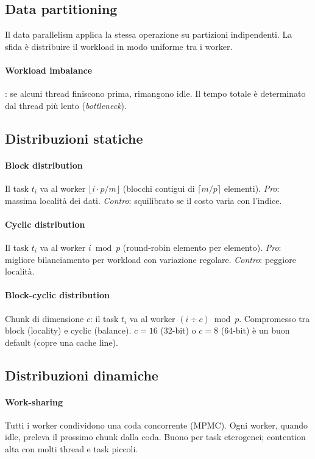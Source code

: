 \documentclass[11pt,a4paper]{article}
\theoremstyle{remark}
\begin{document}
\subsection{Data partitioning}

Il data parallelism applica la stessa operazione su partizioni indipendenti. La sfida è distribuire il workload in modo uniforme tra i worker.

\paragraph{Workload imbalance}: se alcuni thread finiscono prima, rimangono idle. Il tempo totale è determinato dal thread più lento (\emph{bottleneck}).

\subsection{Distribuzioni statiche}

\paragraph{Block distribution}
Il task $t_i$ va al worker $\lfloor i \cdot p / m \rfloor$ (blocchi contigui di $\lceil m/p \rceil$ elementi).
\emph{Pro}: massima località dei dati. \emph{Contro}: squilibrato se il costo varia con l'indice.

\paragraph{Cyclic distribution}
Il task $t_i$ va al worker $i \bmod p$ (round-robin elemento per elemento).
\emph{Pro}: migliore bilanciamento per workload con variazione regolare. \emph{Contro}: peggiore località.

\paragraph{Block-cyclic distribution}
Chunk di dimensione $c$: il task $t_i$ va al worker $(i \div c) \bmod p$.
Compromesso tra block (locality) e cyclic (balance). $c = 16$ (32-bit) o $c = 8$ (64-bit) è un buon default (copre una cache line).

\subsection{Distribuzioni dinamiche}

\paragraph{Work-sharing}
Tutti i worker condividono una coda concorrente (MPMC). Ogni worker, quando idle, preleva il prossimo chunk dalla coda. Buono per task eterogenei; contention alta con molti thread e task piccoli.
\end{document}
